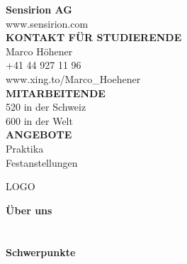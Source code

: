 \documentclass[twoside, 8pt]{extarticle}
\begin{document}
\setlength{\parindent}{0pt}
\begin{minipage}[t][\textheight][t]{\textwidth}  %

\begin{minipage}[t][0.4\textheight][t]{0.6\textwidth}
\textbf{\large \color{copperred} Sensirion AG }\\
www.sensirion.com\\


\textbf{KONTAKT FÜR STUDIERENDE}\\
Marco Höhener\\
+41 44 927 11 96\\
www.xing.to/Marco\_Hoehener\\


\textbf{MITARBEITENDE}\\
520 in der Schweiz\\
600 in der Welt\\

\textbf{ANGEBOTE}\\
Praktika\\
Festanstellungen\\

\end{minipage}%
\begin{minipage}[t][0.4\textheight][t]{0.35\textwidth}
\centering
LOGO

\end{minipage}
\begin{minipage}[t][0.55\textheight][t]{\textwidth}
\textbf{\large \color{copperred} Über uns }\\\\
\blindtext\\

\textbf{\large \color{copperred} Schwerpunkte }\\\\
\blindtext

\end{minipage}%

\end{minipage}
\end{document}
